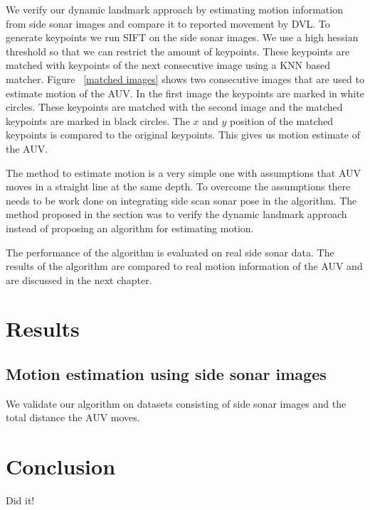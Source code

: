 \documentclass[12pt,draft]{dalcsthesis}
\begin{document}
We verify our dynamic landmark approach by estimating motion information from side sonar images and compare it to reported movement by DVL. To generate keypoints we run SIFT on the side sonar images. We use a high hessian threshold so that we can restrict the amount of keypoints. These keypoints are matched with keypoints of the next consecutive image using a KNN based matcher. Figure ~\ref{matched images} shows two consecutive images that are used to estimate motion of the AUV. In the first image the keypoints are marked in white circles. These keypoints are matched with the second image and the matched keypoints are marked in black circles. The $x$ and $y$ position of the matched keypoints is compared to the original keypoints. This gives us motion estimate of the AUV. 

\begin{figure}
  \centering
  \qquad
  \qquad
 \caption{\label{fig- Two consective side sonar images. The white circles represent the landmarks and the black circle in next image shows the matched keypoints.}}
\end{figure}

The method to estimate motion is a very simple one with assumptions that AUV moves in a straight line at the same depth. To overcome the assumptions there needs to be work done on integrating side scan sonar pose in the algorithm. The method proposed in the section was to verify the dynamic landmark approach instead of proposing an algorithm for estimating motion. 

The performance of the algorithm is evaluated on real side sonar data. The results of the algorithm are compared to real motion information of the AUV and are discussed in the next chapter. 

\chapter{Results}
\section{Motion estimation using side sonar images}
We validate our algorithm on datasets consisting of side sonar images
and the total distance the AUV moves. 


\chapter{Conclusion}

Did it!



\end{document}
